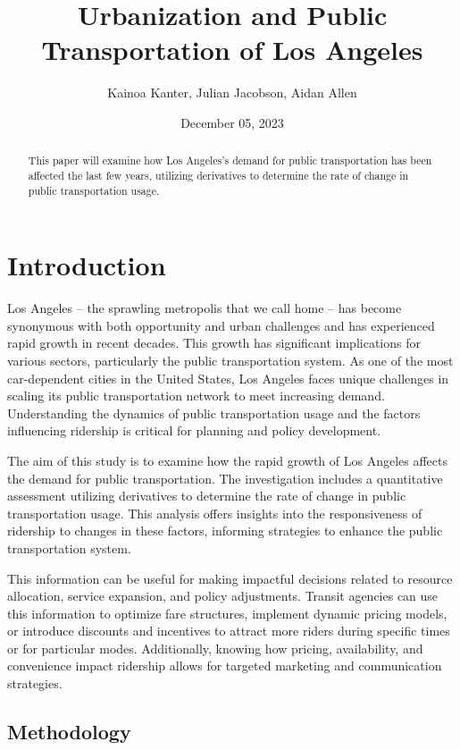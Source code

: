 \documentclass[
]{article}
\title{Urbanization and Public Transportation of Los Angeles}
\author{Kainoa Kanter, Julian Jacobson, Aidan Allen}
\date{December 05, 2023}
\begin{document}
\maketitle
\begin{abstract}
This paper will examine how Los Angeles's demand for public
transportation has been affected the last few years, utilizing
derivatives to determine the rate of change in public transportation
usage.
\end{abstract}

\hypertarget{introduction}{%
\section{Introduction}\label{introduction}}

Los Angeles -- the sprawling metropolis that we call home -- has become
synonymous with both opportunity and urban challenges and has
experienced rapid growth in recent decades. This growth has significant
implications for various sectors, particularly the public transportation
system. As one of the most car-dependent cities in the United States,
Los Angeles faces unique challenges in scaling its public transportation
network to meet increasing demand. Understanding the dynamics of public
transportation usage and the factors influencing ridership is critical
for planning and policy development.

The aim of this study is to examine how the rapid growth of Los Angeles
affects the demand for public transportation. The investigation includes
a quantitative assessment utilizing derivatives to determine the rate of
change in public transportation usage. This analysis offers insights
into the responsiveness of ridership to changes in these factors,
informing strategies to enhance the public transportation system.

This information can be useful for making impactful decisions related to
resource allocation, service expansion, and policy adjustments. Transit
agencies can use this information to optimize fare structures, implement
dynamic pricing models, or introduce discounts and incentives to attract
more riders during specific times or for particular modes. Additionally,
knowing how pricing, availability, and convenience impact ridership
allows for targeted marketing and communication strategies.

\hypertarget{methodology}{%
\subsection{Methodology}\label{methodology}}
\end{document}
